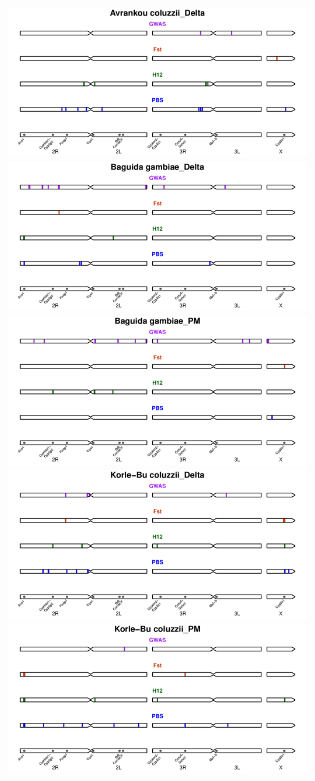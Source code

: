 \documentclass[a4paper,12pt]{article}
\begin{document}
\clearpage

\begin{figure}[h]
	\includegraphics*[width = 7.9cm]{../supplementary_implicated_regions/Avrankou_coluzzii_Delta_implicated_regions.pdf}
	\vskip 0.4cm
	\includegraphics*[width = 7.9cm]{../supplementary_implicated_regions/Baguida_gambiae_Delta_implicated_regions.pdf}
	\includegraphics*[width = 7.9cm]{../supplementary_implicated_regions/Baguida_gambiae_PM_implicated_regions.pdf}
	\vskip 0.4cm
	\includegraphics*[width = 7.9cm]{../supplementary_implicated_regions/Korle-Bu_coluzzii_Delta_implicated_regions.pdf}
	\includegraphics*[width = 7.9cm]{../supplementary_implicated_regions/Korle-Bu_coluzzii_PM_implicated_regions.pdf}

\end{figure}
\end{document}
